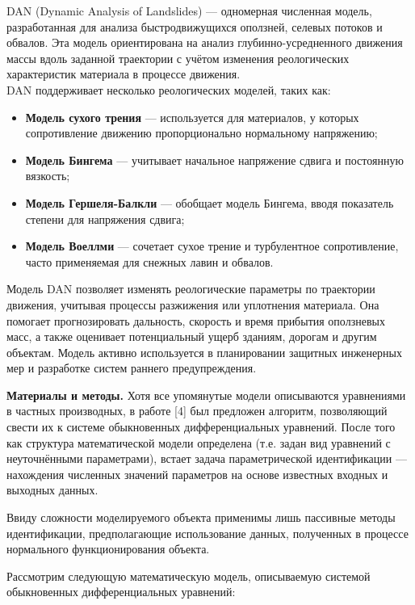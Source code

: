\begin{multicols}{2}
DAN (Dynamic Analysis of Landslides) --- одномерная численная модель,
разработанная для анализа быстродвижущихся оползней, селевых потоков и
обвалов. Эта модель ориентирована на анализ глубинно-усредненного
движения массы вдоль заданной траектории с учётом изменения
реологических характеристик материала в процессе движения.\\
DAN поддерживает несколько реологических моделей, таких как:

\begin{itemize}[leftmargin=*]
\item
  {\bfseries Модель сухого трения} --- используется для материалов, у
  которых сопротивление движению пропорционально нормальному напряжению;
\item
  {\bfseries Модель Бингема} --- учитывает начальное напряжение сдвига и
  постоянную вязкость;
\item
  {\bfseries Модель Гершеля-Балкли} --- обобщает модель Бингема, вводя
  показатель степени для напряжения сдвига;
\item
  {\bfseries Модель Воеллми} --- сочетает сухое трение и турбулентное
  сопротивление, часто применяемая для снежных лавин и обвалов.
\end{itemize}

Модель DAN позволяет изменять реологические параметры по траектории
движения, учитывая процессы разжижения или уплотнения материала. Она
помогает прогнозировать дальность, скорость и время прибытия оползневых
масс, а также оценивает потенциальный ущерб зданиям, дорогам и другим
объектам. Модель активно используется в планировании защитных инженерных
мер и разработке систем раннего предупреждения.

{\bfseries Материалы и методы.} Хотя все упомянутые модели описываются
уравнениями в частных производных, в работе {[}4{]} был предложен
алгоритм, позволяющий свести их к системе обыкновенных дифференциальных
уравнений. После того как структура математической модели определена
(т.е. задан вид уравнений с неуточнёнными параметрами), встает задача
параметрической идентификации --- нахождения численных значений
параметров на основе известных входных и выходных данных.

Ввиду сложности моделируемого объекта применимы лишь пассивные методы
идентификации, предполагающие использование данных, полученных в
процессе нормального функционирования объекта.

Рассмотрим следующую математическую модель, описываемую системой
обыкновенных дифференциальных уравнений:


\end{multicols}
